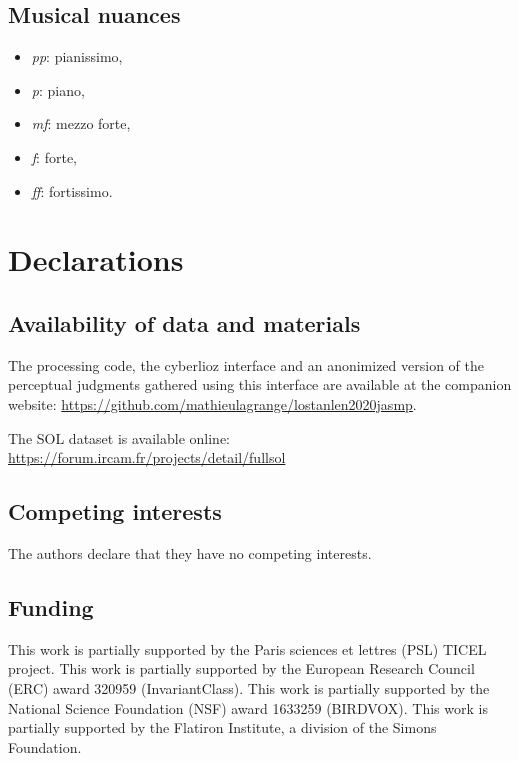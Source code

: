 \documentclass{bmcart}
\newcommand{\nmu}{}
\begin{document}
\begin{backmatter}
\subsection*{Musical nuances}

\begin{itemize}
  \item \emph{pp}: pianissimo,
  \item \emph{p}: piano,
  \item \emph{mf}: mezzo forte,
  \item \emph{f}: forte,
  \item \emph{ff}: fortissimo.
\end{itemize}


\section*{Declarations}

\subsection*{\nmu Availability of data and materials}

The processing code, the cyberlioz interface and an anonimized version of the  perceptual judgments gathered using this interface are available at the companion website: \url{https://github.com/mathieulagrange/lostanlen2020jasmp}.

The SOL dataset is available online: \url{https://forum.ircam.fr/projects/detail/fullsol}

\subsection*{\nmu Competing interests}
  The authors declare that they have no competing interests.


\subsection*{\nmu Funding}
This work is partially supported by the Paris sciences et lettres (PSL) TICEL project.
This work is partially supported by the European Research Council (ERC) award 320959 (InvariantClass).
This work is partially supported by the National Science Foundation (NSF) award 1633259 (BIRDVOX).
This work is partially supported by the Flatiron Institute, a division of the Simons Foundation.


\end{backmatter}
\end{document}
